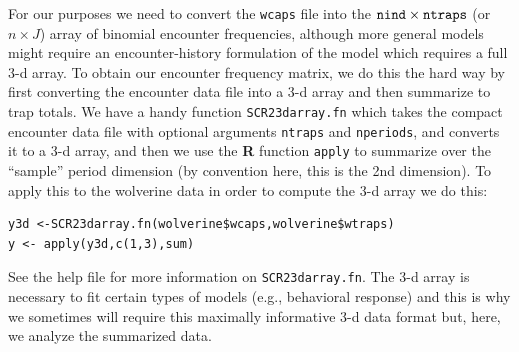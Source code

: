 For our purposes we need to convert the \mbox{\tt wcaps} file into the
$\mbox{\tt nind} \times \mbox{\tt ntraps}$ (or $n \times J$) array of
binomial encounter frequencies, although more general models might
require an encounter-history formulation of the model which requires a
full 3-d array.  To obtain our encounter frequency matrix, we do this
the hard way by first converting the encounter data file into a 3-d
array and then summarize to trap totals. We have a handy function
\mbox{\tt SCR23darray.fn} which takes the compact encounter data file
with optional arguments \mbox{\tt ntraps} and \mbox{\tt nperiods}, and
converts it to a 3-d array, and then we use the {\bf R} function
\mbox{\tt apply} to summarize over the ``sample'' period dimension (by
convention here, this is the 2nd dimension). To apply this to the
wolverine data in order to compute the 3-d array we do this: 
{\small
\begin{verbatim}
y3d <-SCR23darray.fn(wolverine$wcaps,wolverine$wtraps)
y <- apply(y3d,c(1,3),sum)
\end{verbatim}
} 
See the help file for more information on \mbox{\tt SCR23darray.fn}.
The 3-d array is necessary to fit certain types of models (e.g.,
behavioral response) and this is why we sometimes will require this
maximally informative 3-d data format but, here, we analyze the
summarized data.


